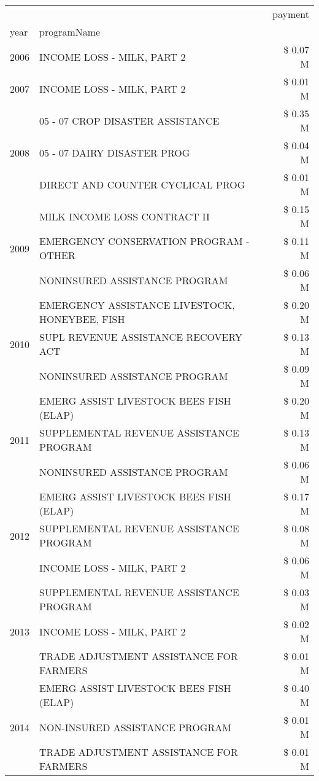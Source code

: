 \begin{tabular}{llr}
\toprule
 &  & payment \\
year & programName &  \\
\midrule
2006 & INCOME LOSS - MILK, PART 2 & \$ 0.07 M \\
\cline{1-3}
2007 & INCOME LOSS - MILK, PART 2 & \$ 0.01 M \\
\cline{1-3}
\multirow[t]{3}{*}{2008} & 05 - 07 CROP DISASTER ASSISTANCE & \$ 0.35 M \\
 & 05 - 07 DAIRY DISASTER PROG & \$ 0.04 M \\
 & DIRECT AND COUNTER CYCLICAL PROG & \$ 0.01 M \\
\cline{1-3}
\multirow[t]{3}{*}{2009} & MILK INCOME LOSS CONTRACT II & \$ 0.15 M \\
 & EMERGENCY CONSERVATION PROGRAM - OTHER & \$ 0.11 M \\
 & NONINSURED ASSISTANCE PROGRAM & \$ 0.06 M \\
\cline{1-3}
\multirow[t]{3}{*}{2010} & EMERGENCY ASSISTANCE LIVESTOCK, HONEYBEE, FISH & \$ 0.20 M \\
 & SUPL REVENUE ASSISTANCE RECOVERY ACT & \$ 0.13 M \\
 & NONINSURED ASSISTANCE PROGRAM & \$ 0.09 M \\
\cline{1-3}
\multirow[t]{3}{*}{2011} & EMERG ASSIST LIVESTOCK BEES FISH (ELAP) & \$ 0.20 M \\
 & SUPPLEMENTAL REVENUE ASSISTANCE PROGRAM & \$ 0.13 M \\
 & NONINSURED ASSISTANCE PROGRAM & \$ 0.06 M \\
\cline{1-3}
\multirow[t]{3}{*}{2012} & EMERG ASSIST LIVESTOCK BEES FISH (ELAP) & \$ 0.17 M \\
 & SUPPLEMENTAL REVENUE ASSISTANCE PROGRAM & \$ 0.08 M \\
 & INCOME LOSS - MILK, PART 2 & \$ 0.06 M \\
\cline{1-3}
\multirow[t]{3}{*}{2013} & SUPPLEMENTAL REVENUE ASSISTANCE PROGRAM & \$ 0.03 M \\
 & INCOME LOSS - MILK, PART 2 & \$ 0.02 M \\
 & TRADE ADJUSTMENT ASSISTANCE FOR FARMERS & \$ 0.01 M \\
\cline{1-3}
\multirow[t]{3}{*}{2014} & EMERG ASSIST LIVESTOCK BEES FISH (ELAP) & \$ 0.40 M \\
 & NON-INSURED ASSISTANCE PROGRAM & \$ 0.01 M \\
 & TRADE ADJUSTMENT ASSISTANCE FOR FARMERS & \$ 0.01 M \\

\end{tabular}
